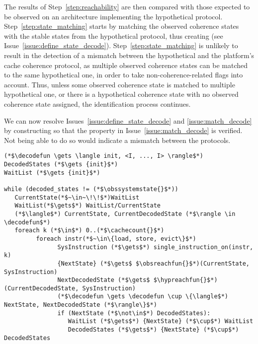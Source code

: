 The results of Step~\ref{step:reachability} are then compared with those
expected to be observed on an architecture implementing the hypothetical
protocol. Step~\ref{step:state_matching} starts by matching the observed
coherence states with the stable states from the hypothetical protocol, thus
creating \decodefun{} (see Issue~\ref{issue:define_state_decode}).
Step~\ref{step:state_matching} is unlikely to result in the detection of a
mismatch between the hypothetical and the platform's cache coherence protocol,
as multiple observed coherence states can be matched to the same hypothetical
one, in order to take non-coherence-related flags into account. Thus, unless
some observed coherence state is matched to multiple hypothetical one, or there
is a hypothetical coherence state with no observed coherence state assigned, the
identification process continues.

\begin{step}
\label{step:state_matching}
   We can now resolve Issues~\ref{issue:define_state_decode} and
   \ref{issue:match_decode} by constructing \decodefun{} so that the property
   in Issue~\ref{issue:match_decode} is verified. Not being able to do so would
   indicate a mismatch between the protocols.

\begin{lstlisting}
(*$\decodefun \gets \langle init, <I, ..., I> \rangle$*)
DecodedStates (*$\gets {init}$*)
WaitList (*$\gets {init}$*)

while (decoded_states != (*$\obssystemstate{}$*))
   CurrentState(*$~\in~\!\!$*)WaitList
   WaitList(*$\gets$*) WaitList/CurrentState
   (*$\langle$*) CurrentState, CurrentDecodedState (*$\rangle \in \decodefun$*)
   foreach k (*$\in$*) 0..(*$\cachecount{}$*)
         foreach instr(*$~\in\{load, store, evict\}$*)
               SysInstruction (*$\gets$*) single_instruction_on(instr, k)
               {NextState} (*$\gets$ $\obsreachfun{}$*)(CurrentState, SysInstruction)
               NextDecodedState (*$\gets$ $\hypreachfun{}$*)(CurrentDecodedState, SysInstruction)
               (*$\decodefun \gets \decodefun \cup \{\langle$*) NextState, NextDecodedState (*$\rangle\}$*)
               if (NextState (*$\not\in$*) DecodedStates):
                  WaitList (*$\gets$*) {NextState} (*$\cup$*) WaitList
                  DecodedStates (*$\gets$*) {NextState} (*$\cup$*) DecodedStates
\end{lstlisting}
\end{step}

